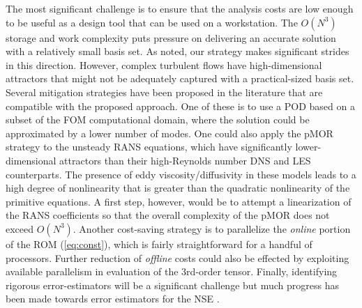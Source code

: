 


The most significant challenge is to ensure that the analysis costs
are low enough to be useful as a design tool that can be used on a
workstation.  The $O(N^3)$ storage and work complexity puts pressure on
delivering an accurate solution with a relatively small basis set.  As noted,
our strategy makes significant strides in this direction.  However, 
complex turbulent flows have high-dimensional attractors that might not
be adequately captured with a practical-sized basis set.  Several
mitigation strategies have been proposed in the literature that are
compatible with the proposed approach.  One of these is to use a POD
based on a subset of the FOM computational domain, where the solution
could be approximated by a lower number of modes.   
    One could also apply the pMOR strategy to the unsteady
RANS equations, which have significantly lower-dimensional attractors
than their high-Reynolds number DNS and LES counterparts.  
The presence of eddy viscosity/diffusivity in these models leads to
a high degree of nonlinearity that is greater than the quadratic
nonlinearity of the primitive equations.  A first step, however, would
be to attempt a linearization of the RANS coefficients so that the
overall complexity of the pMOR does not exceed $O(N^3)$.
  Another cost-saving strategy is to parallelize the {\em online} portion of
the ROM (\ref{eq:const}), which is fairly straightforward for a handful of
processors.  Further reduction of {\em offline} costs could also be effected
by exploiting available parallelism in evaluation of the 3rd-order tensor.
   Finally, identifying rigorous error-estimators will be a 
significant challenge but much progress has been made towards
error estimators for the NSE \cite{fick18,patera05}.








